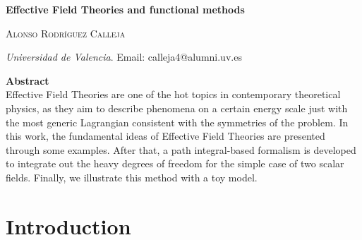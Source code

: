 \documentclass[11pt]{article}
\begin{document}
\begin{titlepage}
    \centering
    
    \vspace*{2cm}
    
    {\huge \textbf{Effective Field Theories and functional methods}}
    
    \vspace{1.5cm}
    
    {\large 
    \textsc{Alonso Rodríguez Calleja} 
    }
    
    \vspace{1cm}
    
    {\small
    \textit{Universidad de Valencia}. Email: calleja4@alumni.uv.es
    }
    
    \vspace{2cm}
    
    \begin{center}
        \begin{minipage}{0.85\textwidth}
            \centering
            \textbf{{Abstract}}\\[0.5em]
            
            \small %
            \setlength{\parindent}{0pt} %
            \setlength{\parskip}{0.5em} %
            \justifying
                Effective Field Theories are one of the hot topics in contemporary theoretical physics, as they aim to describe phenomena on a certain energy scale just with the most generic Lagrangian consistent with the symmetries of the problem. In this work, the fundamental ideas of Effective Field Theories are presented through some examples. After that, a path integral-based formalism is developed to integrate out the heavy degrees of freedom for the simple case of two scalar fields. Finally, we illustrate this method with a toy model.
        \end{minipage}
    \end{center}

\end{titlepage}

\section{Introduction}
\end{document}
